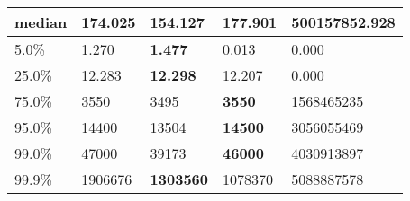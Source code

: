 \begin{table}[H]
\begin{tabular}{|l|m{10em}|m{10em}|m{10em}|m{10em}|}
\hline median & 174.025 & 154.127 & \bfseries 177.901 & \cellcolor[rgb]{0.9, 0.54, 0.52} 500157852.928 \\
\hline 5.0\% & 1.270 & \bfseries 1.477 & 0.013 & \cellcolor[rgb]{0.9, 0.54, 0.52} 0.000 \\
\hline 25.0\% & 12.283 & \bfseries 12.298 & 12.207 & \cellcolor[rgb]{0.9, 0.54, 0.52} 0.000 \\
\hline 75.0\% & 3550 & 3495 & \bfseries 3550 & \cellcolor[rgb]{0.9, 0.54, 0.52} 1568465235 \\
\hline 95.0\% & 14400 & 13504 & \bfseries 14500 & \cellcolor[rgb]{0.9, 0.54, 0.52} 3056055469 \\
\hline 99.0\% & 47000 & 39173 & \bfseries 46000 & \cellcolor[rgb]{0.9, 0.54, 0.52} 4030913897 \\
\hline 99.9\% & 1906676 & \bfseries 1303560 & 1078370 & \cellcolor[rgb]{0.9, 0.54, 0.52} 5088887578 \\
\hline
\end{tabular}
\end{table}
